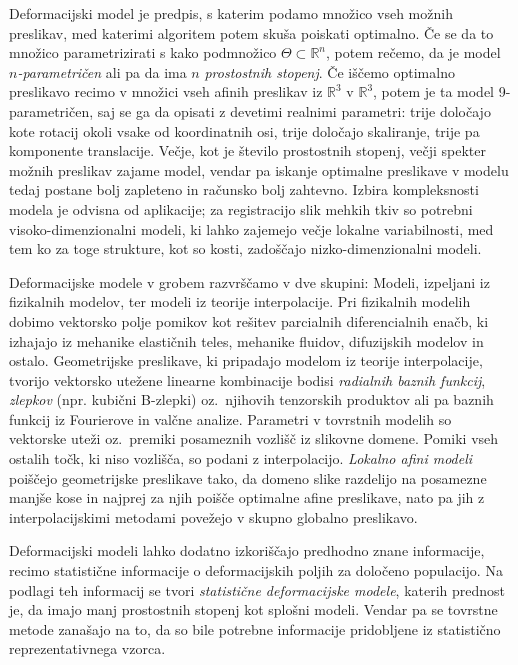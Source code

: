 \documentclass[journal]{IEEEtran}
\begin{document}
Deformacijski model je predpis, s katerim podamo množico vseh možnih preslikav, med katerimi algoritem potem skuša poiskati optimalno. Če se da to množico parametrizirati s kako podmnožico $\Theta\subset\mathbb{R}^n$, potem rečemo, da je model \emph{$n$-parametričen} ali pa da ima $n$ \emph{prostostnih stopenj}. Če iščemo optimalno preslikavo recimo v množici vseh afinih preslikav iz $\mathbb{R}^3$ v $\mathbb{R}^3$, potem je ta model 9-parametričen, saj se ga da opisati z devetimi realnimi parametri: trije določajo kote rotacij okoli vsake od koordinatnih osi, trije določajo skaliranje, trije pa komponente translacije. Večje, kot je število prostostnih stopenj, večji spekter možnih preslikav zajame model, vendar pa iskanje optimalne preslikave v modelu tedaj postane bolj zapleteno in računsko bolj zahtevno. Izbira kompleksnosti modela je odvisna od aplikacije; za registracijo slik mehkih tkiv so potrebni visoko-dimenzionalni modeli, ki lahko zajemejo večje lokalne variabilnosti, med tem ko za toge strukture, kot so kosti, zadoščajo nizko-dimenzionalni modeli.

Deformacijske modele v grobem razvrščamo v dve skupini: Modeli, izpeljani iz fizikalnih modelov, ter modeli iz teorije interpolacije. Pri fizikalnih modelih dobimo vektorsko polje pomikov kot rešitev parcialnih diferencialnih enačb, ki izhajajo iz mehanike elastičnih teles, mehanike fluidov, difuzijskih modelov in ostalo. Geometrijske preslikave, ki pripadajo modelom iz teorije interpolacije, tvorijo vektorsko utežene linearne kombinacije bodisi \emph{radialnih baznih funkcij}, \emph{zlepkov} (npr. kubični B-zlepki) oz.~njihovih tenzorskih produktov ali pa baznih funkcij iz Fourierove in valčne analize. Parametri v tovrstnih modelih so vektorske uteži oz.~premiki posameznih vozlišč iz slikovne domene. Pomiki vseh ostalih točk, ki niso vozlišča, so podani z interpolacijo. \emph{Lokalno afini modeli} poiščejo geometrijske preslikave tako, da domeno slike razdelijo na posamezne manjše kose in najprej za njih poišče optimalne afine preslikave, nato pa jih z interpolacijskimi metodami povežejo v skupno globalno preslikavo.

Deformacijski modeli lahko dodatno izkoriščajo predhodno znane informacije, recimo statistične informacije o deformacijskih poljih za določeno populacijo. Na podlagi teh informacij se tvori \emph{statistične deformacijske modele}, katerih prednost je, da imajo manj prostostnih stopenj kot splošni modeli. Vendar pa se tovrstne metode zanašajo na to, da so bile potrebne informacije pridobljene iz statistično reprezentativnega vzorca.
\end{document}
